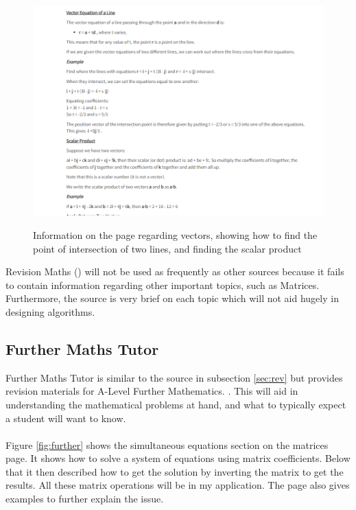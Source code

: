 \documentclass[final]{cmpreport}
\begin{document}
		\begin{figure}[H]
		\caption{Information on the page regarding vectors, showing how to find the point of intersection of two lines, and finding the scalar product}
		\centering
		\includegraphics[scale=0.6]{revisionmaths.png}
		\label{fig:rev}
	\end{figure}
	Revision Maths (\cite{revision}) will not be used as frequently as other sources because it fails to contain information regarding other important topics, such as Matrices. Furthermore, the source is very brief on each topic which will not aid hugely in designing algorithms.
	
	\subsection{Further Maths Tutor} \label{sec:fur}
	
	Further Maths Tutor is similar to the source in subsection \ref{sec:rev} but provides revision materials for A-Level Further Mathematics. \cite{furthermaths}. This will aid in understanding the mathematical problems at hand, and what to typically expect a student will want to know. \\
	\\Figure \ref{fig:further} shows the simultaneous equations section on the matrices page. It shows how to solve a system of equations using matrix coefficients. Below that it then described how to get the solution by inverting the matrix to get the results. All these matrix operations will be in my application. The page also gives examples to further explain the issue. 
	
\end{document}
